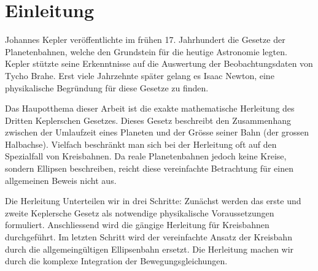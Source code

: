 
\section{Einleitung
  \label{kepler:section:Einleitung}}

Johannes Kepler veröffentlichte im frühen 17. Jahrhundert die Gesetze der Planetenbahnen, welche den Grundstein für die heutige Astronomie legten. Kepler stützte seine Erkenntnisse auf die Auswertung der Beobachtungsdaten von Tycho Brahe. Erst viele Jahrzehnte später gelang es Isaac Newton, eine  physikalische Begründung für diese Gesetze zu finden.

Das Haupotthema dieser Arbeit ist die exakte mathematische Herleitung des Dritten Keplerschen Gesetzes. Dieses Gesetz beschreibt den Zusammenhang zwischen der Umlaufzeit eines Planeten und der Grösse seiner Bahn (der grossen Halbachse). Vielfach beschränkt man sich bei der Herleitung oft auf den Spezialfall von Kreisbahnen. Da reale Planetenbahnen jedoch keine Kreise, sondern Ellipsen beschreiben, reicht diese vereinfachte Betrachtung für einen allgemeinen Beweis nicht aus.

Die Herleitung Unterteilen wir in drei Schritte:
 Zunächst werden das erste und zweite Keplersche Gesetz als notwendige physikalische Voraussetzungen formuliert. Anschliessend wird die gängige Herleitung für Kreisbahnen durchgeführt. Im letzten Schritt wird der vereinfachte Ansatz der Kreisbahn durch die allgemeingültigen Ellipsenbahn ersetzt. Die Herleitung machen wir durch die komplexe Integration der Bewegungsgleichungen.